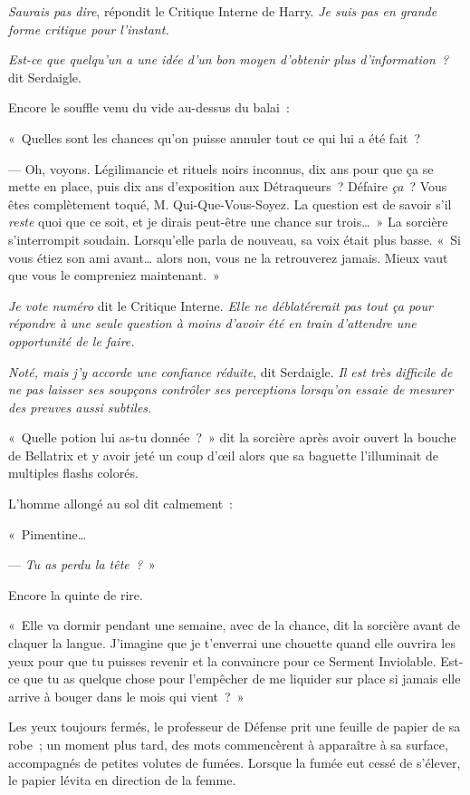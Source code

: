 \emph{Saurais pas dire}, répondit le Critique Interne de Harry. \emph{Je suis pas en grande forme critique pour l'instant.}

\emph{Est-ce que quelqu'un a une idée d'un bon moyen d'obtenir plus d'information~?} dit Serdaigle.

Encore le souffle venu du vide au-dessus du balai~:

«~Quelles sont les chances qu'on puisse annuler tout ce qui lui a été fait~?

--- Oh, voyons. Légilimancie et rituels noirs inconnus, dix ans pour que ça se mette en place, puis dix ans d'exposition aux Détraqueurs~? Défaire \emph{ça}~? Vous êtes complètement toqué, M. Qui-Que-Vous-Soyez. La question est de savoir s'il \emph{reste} quoi que ce soit, et je dirais peut-être une chance sur trois…~» La sorcière s'interrompit soudain. Lorsqu'elle parla de nouveau, sa voix était plus basse. «~Si vous étiez son ami avant… alors non, vous ne la retrouverez jamais. Mieux vaut que vous le compreniez maintenant.~»

\emph{Je vote numéro} dit le Critique Interne. \emph{Elle ne déblatérerait pas tout ça pour répondre à une seule question à moins d'avoir été en train d'attendre une opportunité de le faire.}

\emph{Noté, mais j'y accorde une confiance réduite}, dit Serdaigle. \emph{Il est très difficile de ne pas laisser ses soupçons contrôler ses perceptions lorsqu'on essaie de mesurer des preuves aussi subtiles.}

«~Quelle potion lui as-tu donnée~?~» dit la sorcière après avoir ouvert la bouche de Bellatrix et y avoir jeté un coup d'œil alors que sa baguette l'illuminait de multiples flashs colorés.

L'homme allongé au sol dit calmement~:

«~Pimentine…

--- \emph{Tu as perdu la tête~?}~»

Encore la quinte de rire.

«~Elle va dormir pendant une semaine, avec de la chance, dit la sorcière avant de claquer la langue. J'imagine que je t'enverrai une chouette quand elle ouvrira les yeux pour que tu puisses revenir et la convaincre pour ce Serment Inviolable. Est-ce que tu as quelque chose pour l'empêcher de me liquider sur place si jamais elle arrive à bouger dans le mois qui vient~?~»

Les yeux toujours fermés, le professeur de Défense prit une feuille de papier de sa robe~; un moment plus tard, des mots commencèrent à apparaître à sa surface, accompagnés de petites volutes de fumées. Lorsque la fumée eut cessé de s'élever, le papier lévita en direction de la femme.

